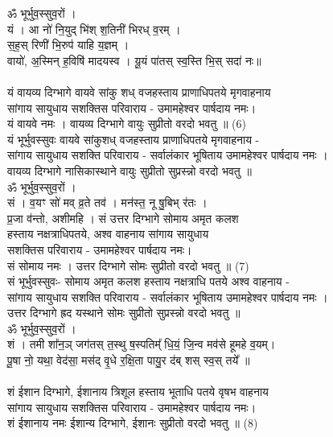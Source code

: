 ॐ भूर्भुव॒स्सुव॒रों ।\\
यं । आ नो॑ नि॒युद् भि॑श् श॒तिनी॑ भिरध् व॒रम् । \\
स॒ह॒स् रिणी॑ भि॒रुप॑ याहि य॒ज्ञम् ।\\
वायो॑, अ॒स्मिन् ह॒विषि॑ मादयस्व । यू॒यं पा॑तस् स्व॒स्ति भि॒स् सदा॑ नः॥\\
\\
यं वायव्य दिग्भागे वायवे सांकु शध् वजहस्ताय प्राणाधिपतये मृगवाहनाय\\
सांगाय सायुधाय सशक्तिस परिवाराय -  उमामहेश्वर पार्षदाय नमः।\\
यं वायवे नमः । वायव्य दिग्भागे  वायुः सुप्रीतो  वरदो भवतु ॥ (6)\\
{\small यं भूर्भुवस्सुवः वायवे सांकुशध् वजहस्ताय प्राणाधिपतये मृगवाहनाय -\\
सांगाय सायुधाय सशक्ति परिवाराय - सर्वालंकार भूषिताय उमामहेश्वर पार्षदाय नमः ।\\
वायव्य दिग्भागे नासिकास्थाने वायुः सुप्रीतो सुप्रस्न्नो वरदो भवतु ॥}\\
ॐ भूर्भुव॒स्सुव॒रों ।\\
सं । व॒यꣳ सो॑ मव् व्र॒ते तव॑ । मन॑स्त॒ नू षु॒बिभ् र॑तः ।\\
प्र॒जा व॑न्तो, अशीमहि । सं उत्तर दिग्भागे सोमाय अमृत कलश \\
हस्ताय नक्षत्राधिपतये, अश्व वाहनाय सांगाय सायुधाय \\
सशक्तिस परिवाराय - उमामहेश्वर पार्षदाय नमः।\\
सं सोमाय नमः । उत्तर दिग्भागे  सोमः सुप्रीतो वरदो भवतु ॥ (7)\\
{\small सं भूर्भुवस्सुवः- सोमाय अमृत कलश हस्ताय नक्षत्राधि पतये अश्व वाहनाय -\\
सांगाय सायुधाय सशक्ति परिवाराय - सर्वालंकार भूषिताय उमामहेश्वर पार्षदाय नमः ।\\
उत्तर दिग्भागे ह्रद यस्थाने सोमः सुप्रीतो सुप्रस्न्नो वरदो भवतु ॥}\\
ॐ भूर्भुव॒स्सुव॒रों ।\\
शं । तमी शा᳚न॒ञ् जग॑तस् त॒स्थु ष॒स्पतिम्᳚ धि॒यं॒ जि॒न्व मव॑से हूमहे व॒यम्।\\
पू॒षा नो॒ यथा॒ वेद॑सा॒ मस॑द् वृ॒धे र॒क्षि॒ता पायु॒र द॑ब् शस् स्व॒स् तये᳚ ॥\\
\\
शं ईशान दिग्भागे, ईशानाय त्रिशूल हस्ताय भूताधि पतये वृषभ वाहनाय\\
सांगाय सायुधाय सशक्तिस परिवाराय -  उमामहेश्वर पार्षदाय नमः।\\
शं ईशानाय नमः  ईशान्य दिग्भागे, ईशानः सुप्रीतो  वरदो भवतु ॥ (8)\\
